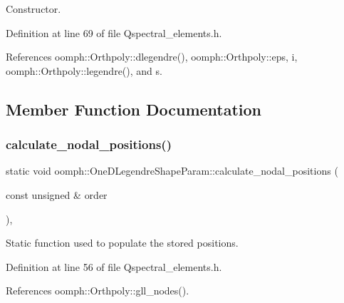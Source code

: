 Constructor. 



Definition at line 69 of file Qspectral\+\_\+elements.\+h.



References oomph\+::\+Orthpoly\+::dlegendre(), oomph\+::\+Orthpoly\+::eps, i, oomph\+::\+Orthpoly\+::legendre(), and s.



\subsection{Member Function Documentation}
\mbox{\label{classoomph_1_1OneDLegendreShapeParam_a3bebbcc4e518f0d1053635096b821d10}} 
\subsubsection{\texorpdfstring{calculate\+\_\+nodal\+\_\+positions()}{calculate\_nodal\_positions()}}
{\footnotesize\ttfamily static void oomph\+::\+One\+D\+Legendre\+Shape\+Param\+::calculate\+\_\+nodal\+\_\+positions (\begin{DoxyParamCaption}\item[{const unsigned \&}]{order }\end{DoxyParamCaption})\hspace{0.3cm}{\ttfamily [inline]}, {\ttfamily [static]}}



Static function used to populate the stored positions. 



Definition at line 56 of file Qspectral\+\_\+elements.\+h.



References oomph\+::\+Orthpoly\+::gll\+\_\+nodes().

\mbox{\label{classoomph_1_1OneDLegendreShapeParam_aadd14533bf38cb1645961e95b2fcd93c}} 
